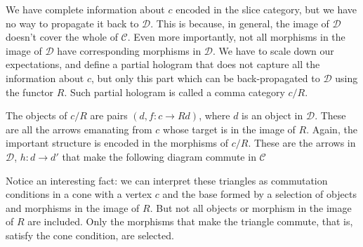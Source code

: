 \documentclass[11pt]{amsart}
\newcommand{\cat}[1]{\mathcal{#1}}
\begin{document}
\begin{figure}[H]
\centering
\end{figure}

We have complete information about $c$ encoded in the slice category, but we have no way to propagate it back to $\cat D$. This is because, in general, the image of $\cat D$ doesn't cover the whole of $\cat C$. Even more importantly, not all morphisms in the image of $\cat D$ have corresponding morphisms in $\cat D$. We have to scale down our expectations, and define a partial hologram that does not capture all the information about $c$, but only this part which can be back-propagated to $\cat D$ using the functor $R$. Such partial hologram is called a comma category $c/R$.

The objects of $c/R$ are pairs $(d, f \colon c \to R d)$, where $d$ is an object in $\cat D$. These are all the arrows emanating from $c$ whose target is in the image of $R$. Again, the important structure is encoded in the morphisms of $c/R$. These are the arrows in $\cat D$, $h \colon d \to d'$ that make the following diagram commute in $\cat C$

\begin{figure}[H]
\centering
\end{figure}
Notice an interesting fact: we can interpret these triangles as commutation conditions in a cone with a vertex $c$ and the base formed by a selection of objects and morphisms in the image of $R$. But not all objects or morphism in the image of $R$ are included. Only the morphisms that make the triangle commute, that is, satisfy the cone condition, are selected. 
\end{document}
